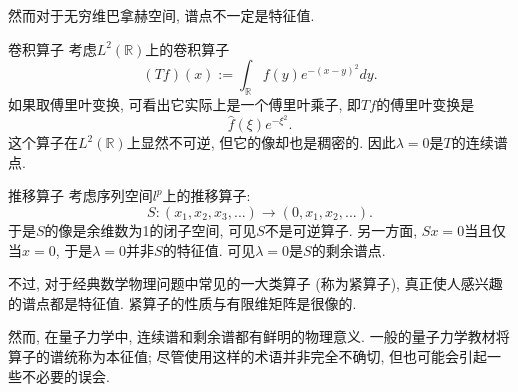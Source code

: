 然而对于无穷维巴拿赫空间, 谱点不一定是特征值.

\begin{example}{卷积算子}
考虑$L^2(\mathbb{R})$上的卷积算子
$$
(Tf)(x):=\int_{\mathbb{R}}f(y)e^{-(x-y)^2}dy.
$$
如果取傅里叶变换, 可看出它实际上是一个傅里叶乘子, 即$Tf$的傅里叶变换是
$$
\hat f(\xi)e^{-\xi^2}.
$$
这个算子在$L^2(\mathbb{R})$上显然不可逆, 但它的像却也是稠密的. 因此$\lambda=0$是$T$的连续谱点.
\end{example}

\begin{example}{推移算子}
考虑序列空间$l^p$上的推移算子:
$$
S:(x_1,x_2,x_3,...)\to(0,x_1,x_2,...).
$$
于是$S$的像是余维数为1的闭子空间, 可见$S$不是可逆算子. 另一方面, $Sx=0$当且仅当$x=0$, 于是$\lambda=0$并非$S$的特征值. 可见$\lambda=0$是$S$的剩余谱点.
\end{example}

不过, 对于经典数学物理问题中常见的一大类算子 (称为紧算子), 真正使人感兴趣的谱点都是特征值. 紧算子的性质与有限维矩阵是很像的.

然而, 在量子力学中, 连续谱和剩余谱都有鲜明的物理意义. 一般的量子力学教材将算子的谱统称为本征值; 尽管使用这样的术语并非完全不确切, 但也可能会引起一些不必要的误会.